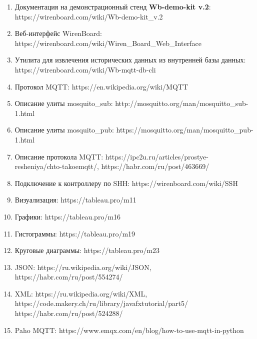 \documentclass[a4paper,14pt]{extarticle}
\newcommand{\stend}{\textbf{Wb-demo-kit v.2}}
\begin{document}
\begin{enumerate}
	\item Документация на демонстрационный стенд \stend:\\ https://wirenboard.com/wiki/Wb-demo-kit\_v.2
	\item Веб-интерфейс WirenBoard: \\https://wirenboard.com/wiki/Wiren\_Board\_Web\_Interface
	\item Утилита для извлечения исторических данных из внутренней базы данных:
	https://wirenboard.com/wiki/Wb-mqtt-db-cli
	\item Протокол MQTT: https://en.wikipedia.org/wiki/MQTT
	\item Описание улиты mosquito\_sub: http://mosquitto.org/man/mosquitto\_sub-1.html
	\item Описание улиты mosquito\_pub: https://mosquitto.org/man/mosquitto\_pub-1.html
	\item Описание протокола MQTT: https://ipc2u.ru/articles/prostye-resheniya/chto-takoemqtt/, https://habr.com/ru/post/463669/
	\item Подключение к контроллеру по SHH: https://wirenboard.com/wiki/SSH
	\item Визуализация: https://tableau.pro/m11
	\item Графики: https://tableau.pro/m16
	\item Гистограммы: https://tableau.pro/m19
	\item Круговые диаграммы: https://tableau.pro/m23
	\item JSON: https://ru.wikipedia.org/wiki/JSON, https://habr.com/ru/post/554274/
	\item XML: https://ru.wikipedia.org/wiki/XML, \\https://code.makery.ch/ru/library/javafxtutorial/part5/\\ https://habr.com/ru/post/524288/
	\item Paho MQTT: https://www.emqx.com/en/blog/how-to-use-mqtt-in-python
\end{enumerate}
\end{document}
